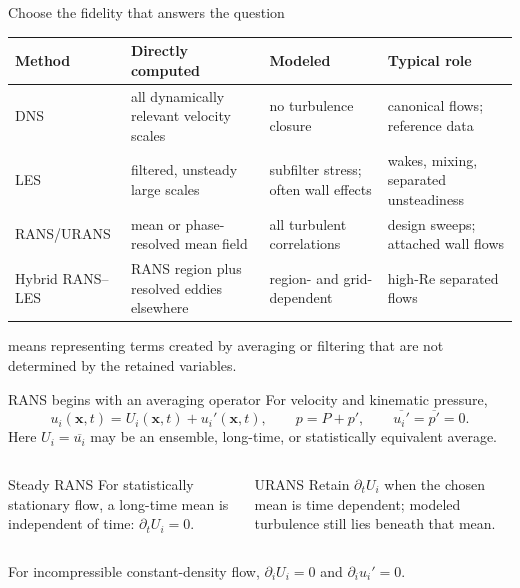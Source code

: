 \documentclass[aspectratio=169,11pt]{beamer}
\newcommand{\mean}[1]{\overline{#1}}
\newcommand{\Rey}{\mathrm{Re}}
\newcommand{\xvec}{\bm{x}}
\begin{document}
\begin{frame}{Choose the fidelity that answers the question}
\small
\setlength{\tabcolsep}{3pt}
\begin{tabular}{@{}L{0.16\textwidth}L{0.23\textwidth}L{0.25\textwidth}L{0.23\textwidth}@{}}
\toprule
\textbf{Method} & \textbf{Directly computed} & \textbf{Modeled} & \textbf{Typical role}\\
\midrule
DNS & all dynamically relevant velocity scales & no turbulence closure & canonical flows; reference data\\[3pt]
LES & filtered, unsteady large scales & subfilter stress; often wall effects & wakes, mixing, separated unsteadiness\\[3pt]
RANS/URANS & mean or phase-resolved mean field & all turbulent correlations & design sweeps; attached wall flows\\[3pt]
Hybrid RANS--LES & RANS region plus resolved eddies elsewhere & region- and grid-dependent & high-$\Rey$ separated flows\\
\bottomrule
\end{tabular}

\vspace{0.6em}
\begin{punchbox}
\centering
{} means representing terms created by averaging or filtering that are not determined by the retained variables.
\end{punchbox}
\end{frame}

\begin{frame}{RANS begins with an averaging operator}
For velocity and kinematic pressure,
\[
  u_i(\xvec,t)=U_i(\xvec,t)+u_i'(\xvec,t),
  \qquad
  p=P+p',
  \qquad
  \mean{u_i'}=\mean{p'}=0.
\]
Here $U_i=\mean{u_i}$ may be an ensemble, long-time, or statistically equivalent average.

\begin{columns}[T,onlytextwidth]
\begin{column}{0.48\textwidth}
\begin{block}{Steady RANS}
For statistically stationary flow, a long-time mean is independent of time: $\partial_t U_i=0$.
\end{block}
\end{column}
\begin{column}{0.48\textwidth}
\begin{block}{URANS}
Retain $\partial_t U_i$ when the chosen mean is time dependent; modeled turbulence still lies beneath that mean.
\end{block}
\end{column}
\end{columns}

For incompressible constant-density flow, $\partial_i U_i=0$ and $\partial_i u_i'=0$.
\end{frame}
\end{document}
